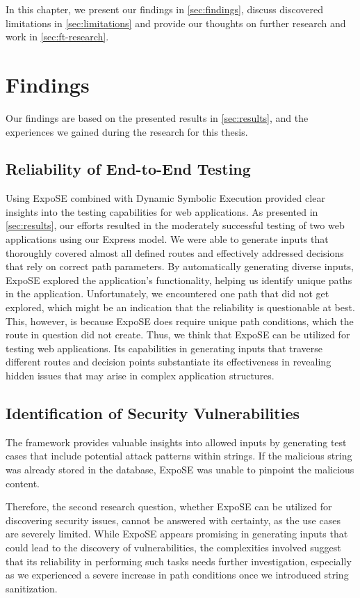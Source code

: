 In this chapter, we present our findings in \autoref{sec:findings}, discuss discovered limitations in \autoref{sec:limitations} and provide our thoughts on further research and work in \autoref{sec:ft-research}.

\section{Findings}
\label{sec:findings}
Our findings are based on the presented results in \autoref{sec:results}, and the experiences we gained during the research for this thesis.

\subsection{Reliability of End-to-End Testing}
Using ExpoSE combined with Dynamic Symbolic Execution provided clear insights into the testing capabilities for web applications. As presented in \autoref{sec:results}, our efforts resulted in the moderately successful testing of two web applications using our Express model. We were able to generate inputs that thoroughly covered almost all defined routes and effectively addressed decisions that rely on correct path parameters. By automatically generating diverse inputs, ExpoSE explored the application's functionality, helping us identify unique paths in the application. Unfortunately, we encountered one path that did not get explored, which might be an indication that the reliability is questionable at best. This, however, is because ExpoSE does require unique path conditions, which the route in question did not create.
Thus, we think that ExpoSE can be utilized for testing web applications. Its capabilities in generating inputs that traverse different routes and decision points substantiate its effectiveness in revealing hidden issues that may arise in complex application structures. 


\subsection{Identification of Security Vulnerabilities}
The framework provides valuable insights into allowed inputs by generating test cases that include potential attack patterns within strings. If the malicious string was already stored in the database, ExpoSE was unable to pinpoint the malicious content.

Therefore, the second research question, whether ExpoSE can be utilized for discovering security issues, cannot be answered with certainty, as the use cases are severely limited. While ExpoSE appears promising in generating inputs that could lead to the discovery of vulnerabilities, the complexities involved suggest that its reliability in performing such tasks needs further investigation, especially as we experienced a severe increase in path conditions once we introduced string sanitization.


